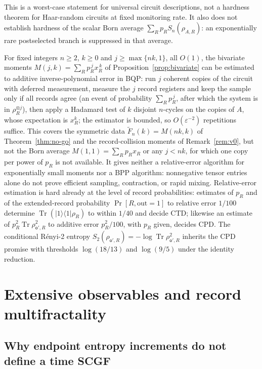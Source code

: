 \documentclass[aps,prx,reprint,superscriptaddress,nobibnotes,longbibliography]{revtex4-2}
\theoremstyle{remark}
\newcommand{\Tr}{\operatorname{Tr}}
\begin{document}
This is a worst-case statement for universal circuit descriptions, not a hardness theorem for Haar-random circuits at fixed monitoring rate.  It also does not establish hardness of the scalar Born average $\sum_Rp_RS_n(\rho_{A,R})$: an exponentially rare postselected branch is suppressed in that average.

For fixed integers $n\ge2$, $k\ge0$ and $j\ge\max\{nk,1\}$, all $O(1)$, the bivariate moments $M(j,k)=\sum_Rp_R^{\,j}x_R^{\,k}$ of Proposition~\ref{prop:bivariate} can be estimated to additive inverse-polynomial error in BQP: run $j$ coherent copies of the circuit with deferred measurement, measure the $j$ record registers and keep the sample only if all records agree (an event of probability $\sum_Rp_R^{\,j}$, after which the system is in $\rho_R^{\otimes j}$), then apply a Hadamard test of $k$ disjoint $n$-cycles on the copies of $A$, whose expectation is $x_R^k$; the estimator is bounded, so $O(\varepsilon^{-2})$ repetitions suffice.  This covers the symmetric data $\widetilde F_n(k)=M(nk,k)$ of Theorem~\ref{thm:no-go} and the record-collision moments of Remark~\ref{rem:v0}, but not the Born average $M(1,1)=\sum_Rp_Rx_R$ or any $j<nk$, for which one copy per power of $p_R$ is not available.  It gives neither a relative-error algorithm for exponentially small moments nor a BPP algorithm: nonnegative tensor entries alone do not prove efficient sampling, contraction, or rapid mixing.  Relative-error estimation is hard already at the level of record probabilities: estimates of $p_R$ and of the extended-record probability $\Pr[R,\mathrm{out}=1]$ to relative error $1/100$ determine $\Tr(|1\rangle\langle1|\rho_R)$ to within $1/40$ and decide CTD; likewise an estimate of $p_R^2\Tr\rho_{\mathsf o',R}^2$ to additive error $p_R^2/100$, with $p_R$ given, decides CPD.  The conditional R\'enyi-2 entropy $S_2(\rho_{\mathsf o',R})=-\log\Tr\rho_{\mathsf o',R}^2$ inherits the CPD promise with thresholds $\log(18/13)$ and $\log(9/5)$ under the identity reduction.

\section{Extensive observables and record multifractality}
\label{sec:records}

\subsection{Why endpoint entropy increments do not define a time SCGF}
\end{document}
